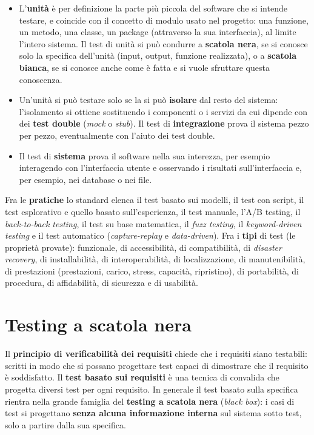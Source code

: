 \begin{itemize}
  \item L'\textbf{unità} è per definizione la parte più piccola del software che si intende testare, e coincide con il
        concetto di modulo usato nel progetto: una funzione, un metodo, una classe, un package (attraverso la sua
        interfaccia), al limite l'intero sistema. Il test di unità si può condurre a \textbf{scatola nera}, se si
        conosce solo la specifica dell'unità (input, output, funzione realizzata), o a \textbf{scatola bianca}, se si
        conosce anche come è fatta e si vuole sfruttare questa conoscenza.
  \item Un'unità si può testare solo se la si può \textbf{isolare} dal resto del sistema: l'isolamento si ottiene
        sostituendo i componenti o i servizi da cui dipende con dei \textbf{test double} (\textit{mock} o
        \textit{stub}). Il test di \textbf{integrazione} prova il sistema pezzo per pezzo, eventualmente con l'aiuto
        dei test double.
  \item Il test di \textbf{sistema} prova il software nella sua interezza, per esempio interagendo con l'interfaccia
        utente e osservando i risultati sull'interfaccia e, per esempio, nei database o nei file.
\end{itemize}

Fra le \textbf{pratiche} lo standard elenca il test basato sui modelli, il test con script, il test esplorativo e
quello basato sull'esperienza, il test manuale, l'A/B testing, il \textit{back-to-back testing}, il test su base
matematica, il \textit{fuzz testing}, il \textit{keyword-driven testing} e il test automatico (\textit{capture-replay} e
\textit{data-driven}). Fra i \textbf{tipi} di test (le proprietà provate): funzionale, di accessibilità, di
compatibilità, di \textit{disaster recovery}, di installabilità, di interoperabilità, di localizzazione, di
manutenibilità, di prestazioni (prestazioni, carico, stress, capacità, ripristino), di portabilità, di procedura, di
affidabilità, di sicurezza e di usabilità.

\section{Testing a scatola nera}

Il \textbf{principio di verificabilità dei requisiti} chiede che i requisiti siano testabili: scritti in modo che si
possano progettare test capaci di dimostrare che il requisito è soddisfatto. Il \textbf{test basato sui requisiti} è una
tecnica di convalida che progetta diversi test per ogni requisito. In generale il test basato sulla specifica rientra
nella grande famiglia del \textbf{testing a scatola nera} (\textit{black box}): i casi di test si progettano
\textbf{senza alcuna informazione interna} sul sistema sotto test, solo a partire dalla sua specifica.

